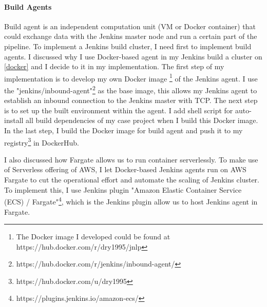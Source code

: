 \paragraph[]{Build Agents}
Build agent is an independent computation unit (VM or Docker container) that could exchange data with the Jenkins master node and run a certain part of the pipeline. To implement a Jenkins build cluster, I need first to implement build agents.
I discussed why I use Docker-based agent in my Jenkins build a cluster on \ref{docker} and I decide to it in my implementation. The first step of my implementation is to develop my own Docker image \footnote{The Docker image I developed could be found at https://hub.docker.com/r/dry1995/jnlp} of the Jenkins agent. I use the "jenkins/inbound-agent"\footnote{https://hub.docker.com/r/jenkins/inbound-agent/} as the base image, this allows my Jenkins agent to establish an inbound connection to the Jenkins master with TCP. The next step is to set up the built environment within the agent. I add shell script for auto-install all build dependencies of my case project when I build this Docker image. In the last step, I build the Docker image for build agent and push it to my registry\footnote{https://hub.docker.com/u/dry1995} in DockerHub. 
\par
I also discussed how Fargate allows us to run container serverlessly. To make use of Serverless offering of AWS, I let Docker-based Jenkins agents run on AWS Fargate to cut the operational effort and automate the scaling of Jenkins cluster. To implement this, I use Jenkins plugin "Amazon Elastic Container Service (ECS) / Fargate"\footnote{https://plugins.jenkins.io/amazon-ecs/}, which is the Jenkins plugin allow us to host Jenkins agent in Fargate.  
